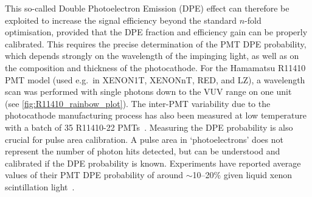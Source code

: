 This so-called Double Photoelectron Emission (DPE) effect can therefore be exploited to increase the signal efficiency beyond the standard $n$-fold optimisation, provided that the DPE fraction and efficiency gain can be properly calibrated. This requires the precise determination of the PMT DPE probability, which depends strongly on the wavelength of the impinging light, as well as on the composition and thickness of the photocathode. For the Hamamatsu R11410 PMT model (used e.g.~in XENON1T, XENONnT, RED, and LZ), a wavelength scan was performed with single photons down to the VUV range on one unit~\cite{Faham:2015kqa} (see \autoref{fig:R11410_rainbow_plot}). The inter-PMT variability due to the photocathode manufacturing process has also been measured at low temperature with a batch of 35 R11410-22 PMTs~\cite{Paredes:2018hxp}. Measuring the DPE probability is also crucial for pulse area calibration. A pulse area in `photoelectrons' does not represent the number of photon hits detected, but can be understood and calibrated if the DPE probability is known. Experiments have reported average values of their PMT DPE probability of around $\sim$10--20\% given liquid xenon scintillation light~\cite{Araujo:2020rwg, Akerib:2019zrt}.

